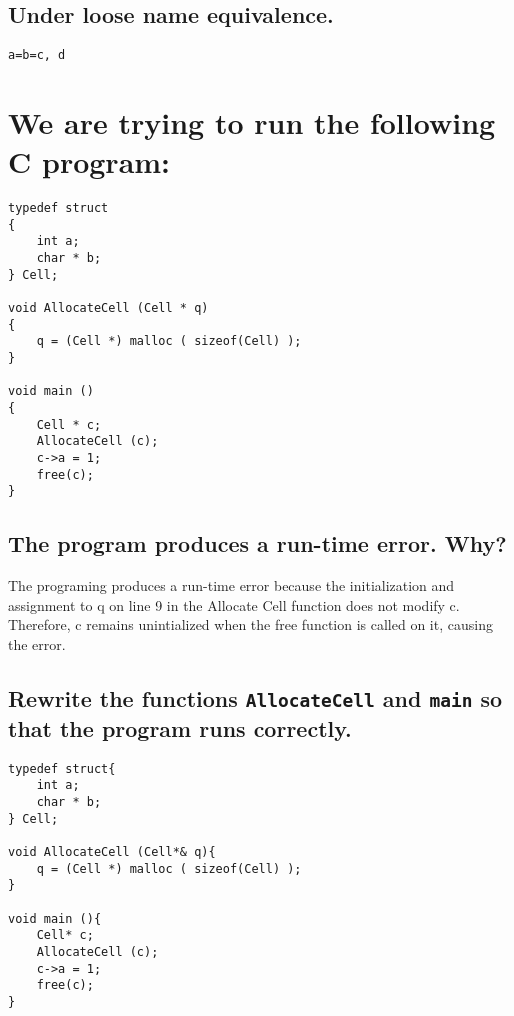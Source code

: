 \documentclass[letterpaper]{article}
\begin{document}
\subsection{Under loose name equivalence.}
\begin{adjustwidth}{2.35em}{0pt}
\begin{Verbatim}[tabsize=4]
a=b=c, d
\end{Verbatim}
\end{adjustwidth}

\section{We are trying to run the following C program:}
\begin{adjustwidth}{2.35em}{0pt}
\begin{lstlisting}
typedef struct
{
	int a;
	char * b;
} Cell;

void AllocateCell (Cell * q)
{
	q = (Cell *) malloc ( sizeof(Cell) );
}

void main ()
{
	Cell * c;
	AllocateCell (c);
	c->a = 1;
	free(c);
}
\end{lstlisting}
\end{adjustwidth}
\subsection{The program produces a run-time error. Why?}
\begin{adjustwidth}{2.35em}{0pt}
	The programing produces a run-time error because the initialization and assignment to q on line 9 in the Allocate Cell function does not modify c. Therefore, c remains unintialized when the free function is called on it, causing the error.
\end{adjustwidth}
\subsection{Rewrite the functions \texttt{AllocateCell} and \texttt{main} so that the program runs correctly.}
\begin{adjustwidth}{2.35em}{0pt}
\begin{lstlisting}
typedef struct{
	int a;
	char * b;
} Cell;

void AllocateCell (Cell*& q){
	q = (Cell *) malloc ( sizeof(Cell) );
}

void main (){
	Cell* c;
	AllocateCell (c);
	c->a = 1;
	free(c);
}
\end{lstlisting}
\end{adjustwidth}
\end{document}
